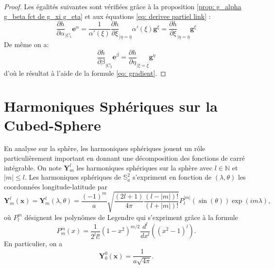 \begin{proof}
Les égalités suivantes sont vérifiées grâce à la proposition \ref{prop: g_alpha g_beta fct de g_xi g_eta} et aux équations \eqref{eq: derivee partiel link} :
\begin{equation}
\dfrac{\partial h}{\partial \alpha}_{|C_1} \mathbf{e}^{\alpha} = \dfrac{1}{\alpha'(\xi)} \dfrac{\partial h}{\partial \xi}_{|\eta = \bar{\eta}} \alpha'(\xi) \mathbf{g}^{\xi} = \dfrac{\partial h}{\partial \xi}_{|\eta = \bar{\eta}} \mathbf{g}^{\xi}
\end{equation}
De même on a:
\begin{equation}
\dfrac{\partial h}{\partial \beta}_{|C_2} \mathbf{e}^{\beta} =  \dfrac{\partial h}{\partial \eta}_{|\xi = \bar{\xi}} \mathbf{g}^{\eta}
\end{equation}
d'où le résultat à l'aide de la formule \eqref{eq: gradient}.
\end{proof}































\section{Harmoniques Sphériques sur la Cubed-Sphere}

En analyse sur la sphère, les harmoniques sphériques jouent un rôle particulièrement important \cite{Atkinson2012, Frye2012} en donnant une décomposition des fonctions de carré intégrable. On note $\mathbf{Y}^l_m$ les harmoniques sphériques sur la sphère avec $l \in \mathbb{N}$ et $|m| \leq l$. Les harmoniques sphériques de $\mathbb{S}_a^2$ s'expriment en fonction de $(\lambda, \theta)$ les coordonnées longitude-latitude par
\begin{equation}
\mathbf{Y}_m^l(\mathbf{x}) = \mathbf{Y}_m^l(\lambda, \theta) = \dfrac{(-1)^m}{a} \sqrt{\dfrac{(2l+1)}{4 \pi} \dfrac{(l-|m|)!}{(l+|m|)!}} P^{|m|}_l (\sin (\theta)) \exp \left( i m \lambda \right),
\label{eq:harmoniques_spheriques}
\end{equation}
où $P^m_l$ désignent les polynômes de Legendre \cite{Lagrange1939} qui s'expriment grâce à la formule
\begin{equation}
P^m_m(x) = \dfrac{1}{2^l l!}(1-x^2)^{m/2} \dfrac{d^l}{dx^l} \left( (x^2-1)^l \right).
\end{equation}
En particulier, on a 
\begin{equation}
\mathbf{Y}_0^0(\mathbf{x}) = \dfrac{1}{a \sqrt{4 \pi}}.
\end{equation}

